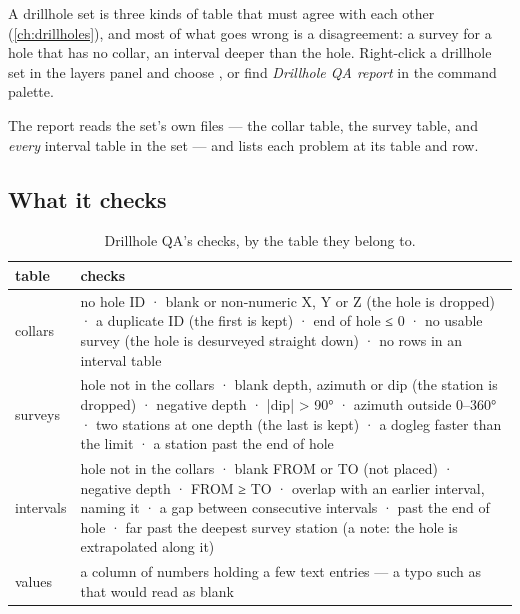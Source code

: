 A drillhole set is three kinds of table that must agree with each other (\cref{ch:drillholes}), and most of what goes wrong is a disagreement: a survey for a hole that has no collar, an interval deeper than the hole. Right-click a drillhole set in the layers panel and choose , or find \emph{Drillhole QA report} in the command palette.

The report reads the set's own files — the collar table, the survey table, and \emph{every} interval table in the set — and lists each problem at its table and row.


\subsection{What it checks}

\begin{table}[htbp]\small
\begin{tabularx}{\linewidth}{@{}lL@{}}\toprule
table & checks \\ \midrule
collars & no hole ID · blank or non-numeric X, Y or Z (the hole is dropped) · a duplicate ID (the first is kept) · end of hole ≤ 0 · no usable survey (the hole is desurveyed straight down) · no rows in an interval table \\
surveys & hole not in the collars · blank depth, azimuth or dip (the station is dropped) · negative depth · |dip| > 90° · azimuth outside 0–360° · two stations at one depth (the last is kept) · a dogleg faster than the limit · a station past the end of hole \\
intervals & hole not in the collars · blank FROM or TO (not placed) · negative depth · FROM ≥ TO · overlap with an earlier interval, naming it · a gap between consecutive intervals · past the end of hole · far past the deepest survey station (a note: the hole is extrapolated along it) \\
values & a column of numbers holding a few text entries — a typo such as  that would read as blank \\ \bottomrule
\end{tabularx}
\caption{Drillhole QA's checks, by the table they belong to.}\label{tab:qa-dh}
\end{table}

